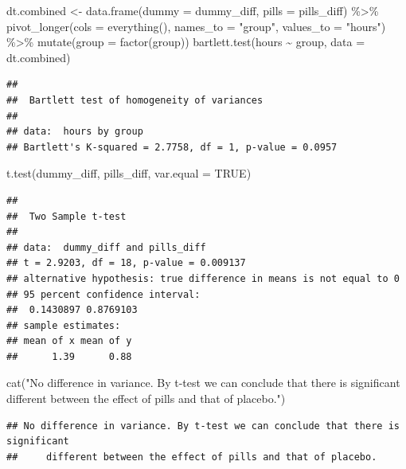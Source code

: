 \documentclass{article}
\newenvironment{Shaded}{\begin{snugshade}}{\end{snugshade}}
\newcommand{\AttributeTok}[1]{\textcolor[rgb]{0.77,0.63,0.00}{#1}}
\newcommand{\ConstantTok}[1]{\textcolor[rgb]{0.00,0.00,0.00}{#1}}
\newcommand{\FunctionTok}[1]{\textcolor[rgb]{0.00,0.00,0.00}{#1}}
\newcommand{\NormalTok}[1]{#1}
\newcommand{\OtherTok}[1]{\textcolor[rgb]{0.56,0.35,0.01}{#1}}
\newcommand{\SpecialCharTok}[1]{\textcolor[rgb]{0.00,0.00,0.00}{#1}}
\newcommand{\StringTok}[1]{\textcolor[rgb]{0.31,0.60,0.02}{#1}}
\begin{document}
\begin{Shaded}
\begin{Highlighting}[]
\NormalTok{dt.combined }\OtherTok{\textless{}{-}} \FunctionTok{data.frame}\NormalTok{(}\AttributeTok{dummy =}\NormalTok{ dummy\_diff, }\AttributeTok{pills =}\NormalTok{ pills\_diff) }\SpecialCharTok{\%\textgreater{}\%}
    \FunctionTok{pivot\_longer}\NormalTok{(}\AttributeTok{cols =} \FunctionTok{everything}\NormalTok{(), }\AttributeTok{names\_to =} \StringTok{"group"}\NormalTok{, }\AttributeTok{values\_to =} \StringTok{"hours"}\NormalTok{) }\SpecialCharTok{\%\textgreater{}\%}
    \FunctionTok{mutate}\NormalTok{(}\AttributeTok{group =} \FunctionTok{factor}\NormalTok{(group))}
\FunctionTok{bartlett.test}\NormalTok{(hours }\SpecialCharTok{\textasciitilde{}}\NormalTok{ group, }\AttributeTok{data =}\NormalTok{ dt.combined)}
\end{Highlighting}
\end{Shaded}

\begin{verbatim}
## 
##  Bartlett test of homogeneity of variances
## 
## data:  hours by group
## Bartlett's K-squared = 2.7758, df = 1, p-value = 0.0957
\end{verbatim}

\begin{Shaded}
\begin{Highlighting}[]
\FunctionTok{t.test}\NormalTok{(dummy\_diff, pills\_diff, }\AttributeTok{var.equal =} \ConstantTok{TRUE}\NormalTok{)}
\end{Highlighting}
\end{Shaded}

\begin{verbatim}
## 
##  Two Sample t-test
## 
## data:  dummy_diff and pills_diff
## t = 2.9203, df = 18, p-value = 0.009137
## alternative hypothesis: true difference in means is not equal to 0
## 95 percent confidence interval:
##  0.1430897 0.8769103
## sample estimates:
## mean of x mean of y 
##      1.39      0.88
\end{verbatim}

\begin{Shaded}
\begin{Highlighting}[]
\FunctionTok{cat}\NormalTok{(}\StringTok{"No difference in variance. By t{-}test we can conclude that there is significant }
\StringTok{    different between the effect of pills and that of placebo."}\NormalTok{)}
\end{Highlighting}
\end{Shaded}

\begin{verbatim}
## No difference in variance. By t-test we can conclude that there is significant 
##     different between the effect of pills and that of placebo.
\end{verbatim}
\end{document}
